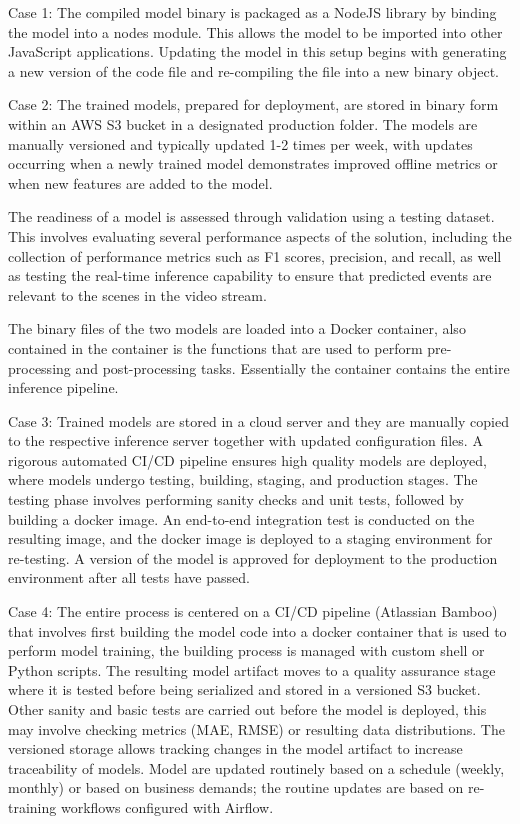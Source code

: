 Case 1: The compiled model binary is packaged as a NodeJS library by binding the model into a nodes module. This allows the model to be imported into other JavaScript applications. Updating the model in this setup begins with generating a new version of the code file and re-compiling the file into a new binary object.

Case 2: The trained models, prepared for deployment, are stored in binary form within an AWS S3 bucket in a designated production folder. The models are manually versioned and typically updated 1-2 times per week, with updates occurring when a newly trained model demonstrates improved offline metrics or when new features are added to the model.

The readiness of a model is assessed through validation using a testing dataset. This involves evaluating several performance aspects of the solution, including the collection of performance metrics such as F1 scores, precision, and recall, as well as testing the real-time inference capability to ensure that predicted events are relevant to the scenes in the video stream.

The binary files of the two models are loaded into a Docker container, also contained in the container is the functions that are used to perform pre-processing and post-processing tasks. Essentially the container contains the entire inference pipeline.

Case 3: Trained models are stored in a cloud server and they are manually copied to the respective inference server together with updated configuration files. A rigorous automated CI/CD pipeline ensures high quality models are deployed, where models undergo testing, building, staging, and production stages. The testing phase involves performing sanity checks and unit tests, followed by building a docker image. An end-to-end integration test is conducted on the resulting image, and the docker image is deployed to a staging environment for re-testing. A version of the model is approved for deployment to the production environment after all tests have passed.

Case 4: The entire process is centered on a CI/CD pipeline (Atlassian Bamboo) that involves first building the model code into a docker container that is used to perform model training, the building process is managed with custom shell or Python scripts. The resulting model artifact moves to a quality assurance stage where it is tested before being serialized and stored in a versioned S3 bucket. Other sanity and basic tests are carried out before the model is deployed, this may involve checking metrics (MAE, RMSE) or resulting data distributions.
The versioned storage allows tracking changes in the model artifact to increase traceability of models. Model are updated routinely based on a schedule (weekly, monthly) or based on business demands; the routine updates are based on re-training workflows configured with Airflow.

